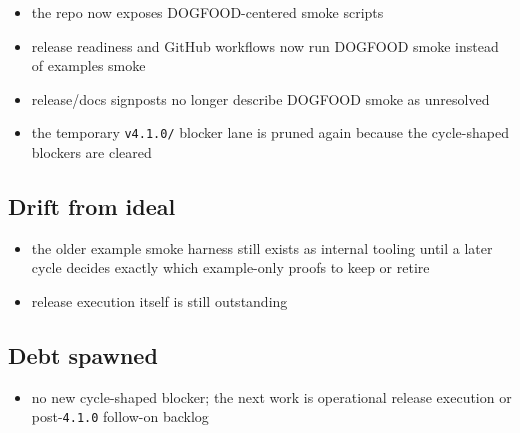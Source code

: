 \begin{itemize}
\tightlist
\item
  the repo now exposes DOGFOOD-centered smoke scripts
\item
  release readiness and GitHub workflows now run DOGFOOD smoke instead of examples smoke
\item
  release/docs signposts no longer describe DOGFOOD smoke as unresolved
\item
  the temporary \texttt{v\allowbreak{}4\allowbreak{}.\allowbreak{}1\allowbreak{}.\allowbreak{}0\allowbreak{}/} blocker lane is pruned again because the cycle-shaped blockers are cleared
\end{itemize}

\subsection{Drift from ideal}\label{record-201-drift-from-ideal}

\begin{itemize}
\tightlist
\item
  the older example smoke harness still exists as internal tooling until a later cycle decides exactly which example-only proofs to keep or retire
\item
  release execution itself is still outstanding
\end{itemize}

\subsection{Debt spawned}\label{record-201-debt-spawned}

\begin{itemize}
\tightlist
\item
  no new cycle-shaped blocker; the next work is operational release execution or post-\texttt{4\allowbreak{}.\allowbreak{}1\allowbreak{}.\allowbreak{}0} follow-on backlog
\end{itemize}

